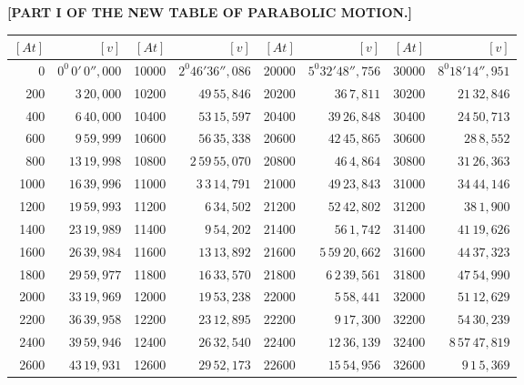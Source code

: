 \clearpage
{}
\begingroup
\centering
\fontsize{9}{9}\selectfont
\setlength{\tabcolsep}{3pt}
\renewcommand{\arraystretch}{.9}
\setlength{\parskip}{0pt}
\textbf{[PART I OF THE NEW TABLE OF PARABOLIC MOTION.]}
\par\vspace{7pt}
\begin{tabular}{|r|r||r|r||r|r||r|r|}
\hline
\([At]\) & \([v]\) & \([At]\) & \([v]\) & \([At]\) & \([v]\) & \([At]\) & \([v]\) \\
\hline
0 & \(0^{0}\,0'\,0'',000\) & 10000 & \(2^{0}46'36'',086\) & 20000 & \(5^{0}32'48'',756\) & 30000 & \(8^{0}18'14'',951\) \\[1pt]
200 & \(3\,20,000\) & 10200 & \(49\,55,846\) & 20200 & \(36\,7,811\) & 30200 & \(21\,32,846\) \\
400 & \(6\,40,000\) & 10400 & \(53\,15,597\) & 20400 & \(39\,26,848\) & 30400 & \(24\,50,713\) \\
600 & \(9\,59,999\) & 10600 & \(56\,35,338\) & 20600 & \(42\,45,865\) & 30600 & \(28\,8,552\) \\
800 & \(13\,19,998\) & 10800 & \(2\,59\,55,070\) & 20800 & \(46\,4,864\) & 30800 & \(31\,26,363\) \\[1pt]
1000 & \(16\,39,996\) & 11000 & \(3\,3\,14,791\) & 21000 & \(49\,23,843\) & 31000 & \(34\,44,146\) \\[1pt]
1200 & \(19\,59,993\) & 11200 & \(6\,34,502\) & 21200 & \(52\,42,802\) & 31200 & \(38\,1,900\) \\
1400 & \(23\,19,989\) & 11400 & \(9\,54,202\) & 21400 & \(56\,1,742\) & 31400 & \(41\,19,626\) \\
1600 & \(26\,39,984\) & 11600 & \(13\,13,892\) & 21600 & \(5\,59\,20,662\) & 31600 & \(44\,37,323\) \\
1800 & \(29\,59,977\) & 11800 & \(16\,33,570\) & 21800 & \(6\,2\,39,561\) & 31800 & \(47\,54,990\) \\[1pt]
2000 & \(33\,19,969\) & 12000 & \(19\,53,238\) & 22000 & \(5\,58,441\) & 32000 & \(51\,12,629\) \\[1pt]
2200 & \(36\,39,958\) & 12200 & \(23\,12,895\) & 22200 & \(9\,17,300\) & 32200 & \(54\,30,239\) \\
2400 & \(39\,59,946\) & 12400 & \(26\,32,540\) & 22400 & \(12\,36,139\) & 32400 & \(8\,57\,47,819\) \\
2600 & \(43\,19,931\) & 12600 & \(29\,52,173\) & 22600 & \(15\,54,956\) & 32600 & \(9\,1\,5,369\) \\

\end{tabular}
